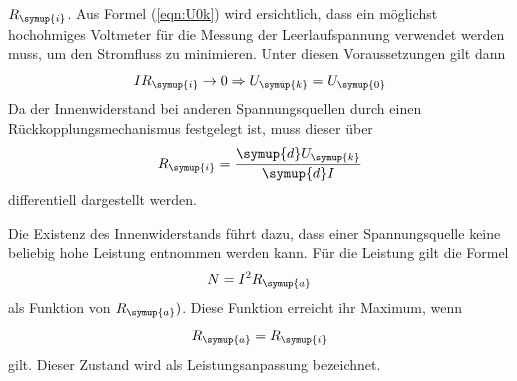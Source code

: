 $R_\symup{i}$.
Aus Formel (\ref{eqn:U0k}) wird ersichtlich, dass ein möglichst hochohmiges
Voltmeter für die Messung der Leerlaufspannung verwendet werden muss, um den
Stromfluss zu minimieren. Unter diesen Voraussetzungen gilt dann
\begin{equation*}
  I R_\symup{i} \rightarrow 0 \Rightarrow U_\symup{k} = U_\symup{0}
\end{equation*}
Da der Innenwiderstand bei anderen Spannungsquellen durch einen
Rückkopplungsmechanismus festgelegt ist, muss dieser über
\begin{equation}
  R_\symup{i}=\frac{\symup{d}U_\symup{k}}{\symup{d}I}
\end{equation}
differentiell dargestellt werden.

Die Existenz des Innenwiderstands führt dazu, dass einer Spannungsquelle keine
beliebig hohe Leistung entnommen werden kann. Für die Leistung gilt die Formel
\begin{equation}
  N=I^2R_\symup{a}
\end{equation}
als Funktion von $R_\symup{a})$. Diese Funktion erreicht ihr Maximum, wenn
\begin{equation*}
  R_\symup{a} = R_\symup{i}
\end{equation*}
gilt. Dieser Zustand wird als Leistungsanpassung bezeichnet.
